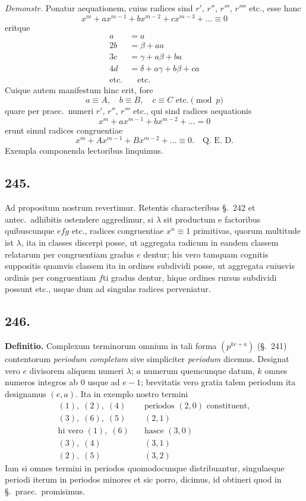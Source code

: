 \documentclass[12pt,a4paper]{article}
\newcommand{\Sec}{\S}
\begin{document}
\textit{Demonstr.} Ponatur aequationem, cuius radices sind $r'$, $r''$, $r'''$, $r''''$ etc., esse hanc
\[
x^m + ax^{m-1} + bx^{m-2} + cx^{m-3} + \ldots \equiv 0
\]
eritque
\[
\begin{aligned}
a &= a\\
2b &= \beta + aa\\
3c &= \gamma + a\beta + ba\\
4d &= \delta + a\gamma + b\beta + ca\\
\text{etc.} & \quad \text{etc.}
\end{aligned}
\]
Cuique autem manifestum hinc erit, fore
\[
a \equiv A,\quad b \equiv B,\quad c \equiv C \text{ etc.}\pmod{p}
\]
quare per praec.~numeri $r'$, $r''$, $r'''$ etc., qui sind radices aequationis
\[
x^m + ax^{m-1} + bx^{m-2} + \ldots = 0
\]
erunt simul radices congruentiae
\[
x^m + Ax^{m-1} + Bx^{m-2} + \ldots \equiv 0. \quad \text{Q.~E.~D.}
\]
Exempla componenda lectoribus linquimus.

\subsection*{245.}

Ad propositum nostrum revertimur. Retentis characteribus \Sec.~242 et antec.~adhibitis ostendere aggredimur, si $\lambda$ sit productum e factoribus quibuscunque $efg$ etc., radices congruentiae $x^n\equiv 1$ primitivas, quorum multitude ist $\lambda$, ita in classes discerpi posse, ut aggregata radicum in eandem classem relatarum per congruentiam gradus $e$ dentur; his vero tamquam cognitis suppositis quamvis classem ita in ordines subdividi posse, ut aggregata cuiusvis ordinis per congruentiam $f$ti gradus dentur, hique ordines rursus subdividi possunt etc., usque dum ad singulas radices perveniatur.

\subsection*{246.}

\textbf{Definitio.} Complexum terminorum omnium in tali forma $(p^{ke+a})$ (\Sec.~241) contentorum \textit{periodum completam} sive simpliciter \textit{periodum} dicemus. Designat vero $e$ divisorem aliquem numeri $\lambda$; $a$ numerum quemcunque datum, $k$ omnes numeros integros ab $0$ usque ad $e-1$; brevitatis vero gratia talem periodum ita designamus $(e,a)$. Ita in exemplo nostro termini
\[
\begin{aligned}
(1),\; (2),\; (4) &\quad \text{periodos } (2,0) \text{ constituent},\\
(3),\; (6),\; (5) &\quad (2,1)\\
\text{hi vero } (1),\; (6) &\quad \text{hasce } (3,0)\\
(3),\; (4) &\quad (3,1)\\
(2),\; (5) &\quad (3,2)
\end{aligned}
\]
Iam si omnes termini in periodos quomodocunque distribuantur, singulaeque periodi iterum in periodos minores et sic porro, dicimus, id obtineri quod in \Sec.~praec.~promisimus.
\end{document}
